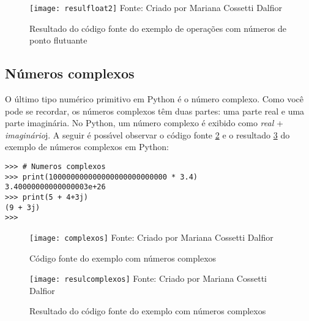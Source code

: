 \begin{figure}[H]
	\begin{center}
		\caption{Resultado do c\'{o}digo fonte do exemplo de opera\c{c}\~{o}es com n\'{u}meros de ponto flutuante} \label{resulfloat2}
		\texttt{[image: resulfloat2]} 
		\newline
		Fonte: Criado por Mariana Cossetti Dalfior
	\end{center}
\end{figure}

\subsection{N\'{u}meros complexos}

O \'{u}ltimo tipo num\'{e}rico primitivo em Python \'{e} o n\'{u}mero complexo. Como voc\^{e} pode se recordar, os n\'{u}meros complexos t\^{e}m duas partes: uma parte real e uma parte imagin\'{a}ria. No Python, um n\'{u}mero complexo \'{e} exibido como \textsl{real} + \textsl{imagin\'{a}rio}j. A seguir \'{e} poss\'{\i}vel observar o c\'{o}digo fonte \ref{fontecomplexos} e o resultado \ref{resulcomplexos} do exemplo de n\'{u}meros complexos em Python:

\begin{lstlisting}
>>> # Numeros complexos
>>> print(100000000000000000000000000 * 3.4)
3.40000000000000003e+26 
>>> print(5 + 4+3j)
(9 + 3j)
>>>
\end{lstlisting}

\begin{figure}[H]
	\begin{center}
		\caption{C\'{o}digo fonte do exemplo com n\'{u}meros complexos} \label{fontecomplexos}
		\texttt{[image: complexos]} 
		\newline
		Fonte: Criado por Mariana Cossetti Dalfior
	\end{center}
\end{figure}

\begin{figure}[H]
	\begin{center}
		\caption{Resultado do c\'{o}digo fonte do exemplo com n\'{u}meros complexos} \label{resulcomplexos}
		\texttt{[image: resulcomplexos]} 
		\newline
		Fonte: Criado por Mariana Cossetti Dalfior
	\end{center}
\end{figure}



